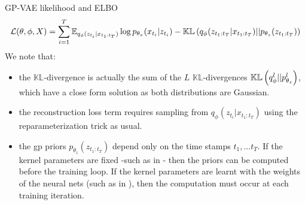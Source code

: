 \begin{frame}{GP-VAE likelihood and ELBO}
    \begin{align}
    \mathcal{L}(\theta, \phi, X) = \sum_{i=1}^T \mathbb{E}_{q_{\phi}(z_{t_i} \vert x_{t_1:t_T})} \log{p_{\theta_x}(x_{t_i} \vert z_{t_i})} - \mathbb{KL}\left( q_{\phi}(z_{t_1:t_T} \vert x_{t_1:t_T}) \vert\vert p_{\theta_z}(z_{t_1:t_T}) \right)
\end{align}
We note that:
\begin{itemize}
    \item the $\mathbb{KL}$-divergence is actually the sum of the $L$ $\mathbb{KL}$-divergences $\mathbb{KL}\left( q_{\phi}^l \vert\vert p_{\theta_z}^l \right)$, which have a close form solution as both distributions are Gaussian. %
    \item the reconstruction loss term requires sampling from $q_{\phi}(z_{t_i} \vert x_{t_1:t_T})$ using the reparameterization trick as usual.
    \item the \gls{gp} priors $p_{\theta_z}(z_{t_1:t_T})$ depend only on the time stamps $t_1,...t_T$. If the kernel parameters are fixed -such as in \cite{fortuin_gp-vae:_2020}- then the priors can be computed before the training loop. If the kernel parameters are learnt with the weights of the neural nets (such as in \cite{zhu_markovian_2023}), then the computation must occur at each training iteration.
\end{itemize}
\end{frame}


